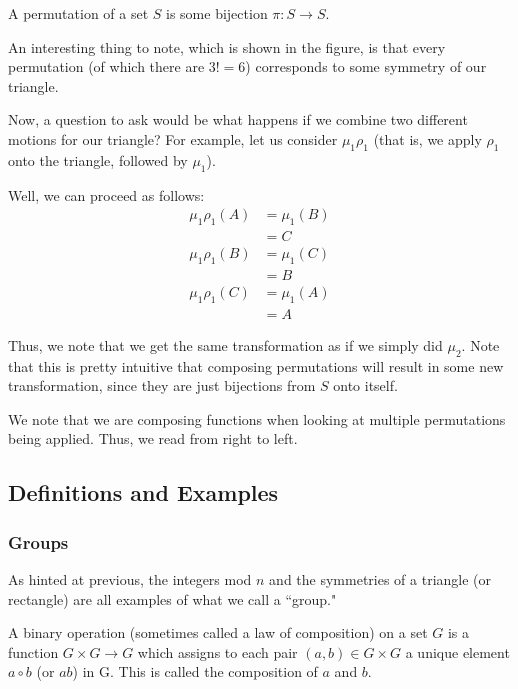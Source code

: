 \documentclass[openany]{book}
\begin{document}
\begin{defn}[Permutation]
	A permutation of a set $S$ is some bijection $\pi : S \to S$.
\end{defn}

An interesting thing to note, which is shown in the figure, is that every permutation (of which there are $3! = 6$) corresponds to some symmetry of our triangle.

Now, a question to ask would be what happens if we combine two different motions for our triangle? For example, let us consider $\mu_1 \rho_1$ (that is, we apply $\rho_1$ onto the triangle, followed by $\mu_1$).

Well, we can proceed as follows:
\begin{align*}
	\mu_1\rho_1(A) &= \mu_1(B) \\
	&= C \\
	\mu_1\rho_1(B) &= \mu_1(C) \\
	&= B \\
	\mu_1\rho_1(C) &= \mu_1(A) \\
	&= A
\end{align*}

Thus, we note that we get the same transformation as if we simply did $\mu_2$. Note that this is pretty intuitive that composing permutations will result in some new transformation, since they are just bijections from $S$ onto itself.

\begin{warn}
	We note that we are composing functions when looking at multiple permutations being applied. Thus, we read from right to left.
\end{warn}

\subsection{Definitions and Examples}
\subsubsection{Groups}
As hinted at previous, the integers mod $n$ and the symmetries of a triangle (or rectangle) are all examples of what we call a ``group."

\begin{defn}
	A binary operation (sometimes called a law of composition) on a set $G$ is a function $G \times G \rightarrow G$ which assigns to each pair $(a, b) \in G \times G$ a unique element $a \circ b$ (or $ab$) in G. This is called the composition of $a$ and $b$.
\end{defn}
\end{document}
